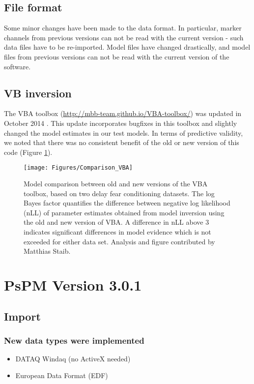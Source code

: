 \documentclass[english]{article}
\numberwithin{equation}{section}
\numberwithin{figure}{section}
\begin{document}
\subsection*{File format}

Some minor changes have been made to the data format. In particular,
marker channels from previous versions can not be read with the current
version - such data files have to be re-imported. Model files have
changed drastically, and model files from previous versions can not
be read with the current version of the software.

\subsection*{VB inversion}

The VBA toolbox (\url{http://mbb-team.github.io/VBA-toolbox/}) was
updated in October 2014 \cite{Daunizeau:2014aa}. This update incorporates
bugfixes in this toolbox and slightly changed the model estimates
in our test models. In terms of predictive validity, we noted that
there was no consistent benefit of the old or new version of this
code (Figure \ref{fig:VBA}).

\begin{figure}
\texttt{[image: Figures/Comparison\_VBA]}
\caption{Model comparison between old and new versions of the VBA toolbox,
based on two delay fear conditioning datasets. The log Bayes factor
quantifies the difference between negative log likelihood (nLL) of
parameter estimates obtained from model inversion using the old and
new version of VBA. A difference in nLL above 3 indicates significant
differences in model evidence which is not exceeded for either data
set. Analysis and figure contributed by Matthias Staib. \label{fig:VBA}}
\end{figure}


\section{PsPM Version 3.0.1}

\subsection*{Import}

\subsubsection*{New data types were implemented}
\begin{itemize}
\item DATAQ Windaq (no ActiveX needed)
\item European Data Format (EDF)
\end{itemize}
\end{document}
